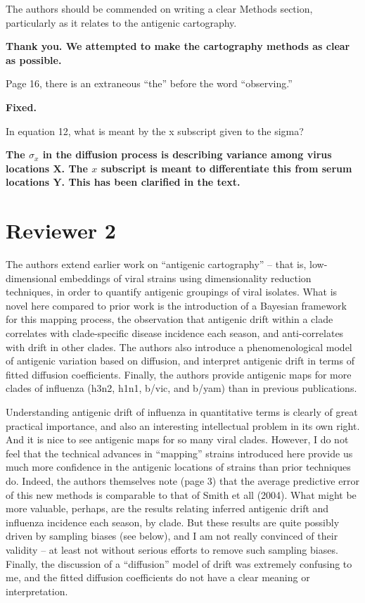 \documentclass[11pt,oneside,letterpaper]{article}
\begin{document}
The authors should be commended on writing a clear Methods section, particularly as it relates to the antigenic cartography.

\textbf{Thank you. We attempted to make the cartography methods as clear as possible.}

Page 16, there is an extraneous ``the'' before the word ``observing.''

\textbf{Fixed.}

In equation 12, what is meant by the x subscript given to the sigma?

\textbf{The $\sigma_x$ in the diffusion process is describing variance among virus locations $\mathbf{X}$.  The $x$ subscript is meant to differentiate this from serum locations $\mathbf{Y}$.  This has been clarified in the text.}

\section*{Reviewer 2}

The authors extend earlier work on ``antigenic cartography'' -- that is, low-dimensional embeddings of viral strains using dimensionality reduction techniques, in order to quantify antigenic groupings of viral isolates. What is novel here compared to prior work is the introduction of a Bayesian framework for this mapping process, the observation that antigenic drift within a clade correlates with clade-specific disease incidence each season, and anti-correlates with drift in other clades. The authors also introduce a phenomenological model of antigenic variation based on diffusion, and interpret antigenic drift in terms of fitted diffusion coefficients. Finally, the authors provide antigenic maps for more clades of influenza (h3n2, h1n1, b/vic, and b/yam) than in previous publications.

Understanding antigenic drift of influenza in quantitative terms is clearly of great practical importance, and also an interesting intellectual problem in its own right. And it is nice to see antigenic maps for so many viral clades. However, I do not feel that the technical advances in ``mapping'' strains introduced here provide us much more confidence in the antigenic locations of strains than prior techniques do. Indeed, the authors themselves note (page 3) that the average predictive error of this new methods is comparable to that of Smith et all (2004). What might be more valuable, perhaps, are the results relating inferred antigenic drift and influenza incidence each season, by clade. But these results are quite possibly driven by sampling biases (see below), and I am not really convinced of their validity -- at least not without serious efforts to remove such sampling biases. Finally, the discussion of a ``diffusion'' model of drift was extremely confusing to me, and the fitted diffusion coefficients do not have a clear meaning or interpretation.
\end{document}
